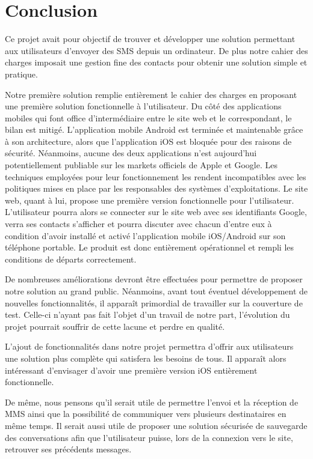  \cleardoublepage

 

\chapter*{Conclusion}


 

Ce projet avait pour objectif de trouver et développer une solution permettant aux utilisateurs d'envoyer des SMS depuis un ordinateur.
De plus notre cahier des charges imposait une gestion fine des contacts pour obtenir une solution simple et pratique.

Notre première solution remplie entièrement le cahier des charges en proposant une première solution fonctionnelle à l'utilisateur. 
Du côté des applications mobiles qui font office d'intermédiaire entre le site web et le correspondant, le bilan est mitigé. L'application mobile Android est terminée et maintenable grâce à son architecture, alors que l'application iOS est bloquée pour des raisons de sécurité.
Néanmoins, aucune des deux applications n'est aujourd'hui potentiellement publiable sur les markets officiels de Apple et Google. Les techniques employées pour leur fonctionnement les rendent incompatibles avec les politiques mises en place par les responsables des systèmes d'exploitations.
Le site web, quant à lui, propose une première version fonctionnelle pour l'utilisateur. L'utilisateur pourra alors se connecter sur le site web avec ses identifiants Google, verra ses contacts s'afficher et pourra discuter avec chacun d'entre eux à condition d'avoir installé et activé l'application mobile iOS/Android sur son téléphone portable.
Le produit est donc entièrement opérationnel et rempli les conditions de départs correctement.

De nombreuses améliorations devront être effectuées pour permettre de proposer notre solution au grand public.
Néanmoins, avant tout éventuel développement de nouvelles fonctionnalités, il apparaît primordial de travailler sur la couverture de test. Celle-ci n'ayant pas fait l'objet d'un travail de notre part, l'évolution du projet pourrait souffrir de cette lacune et perdre en qualité.

L'ajout de fonctionnalités dans notre projet permettra d'offrir aux utilisateurs une solution plus complète qui satisfera les besoins de tous.
Il apparaît alors intéressant d'envisager d'avoir une première version iOS entièrement fonctionnelle.

De même, nous pensons qu'il serait utile de permettre l'envoi et la réception de MMS ainsi que la possibilité de communiquer vers plusieurs destinataires en même temps. Il serait aussi utile de proposer une solution sécurisée de sauvegarde des conversations afin que l'utilisateur puisse, lors de la connexion vers le site, retrouver ses précédents messages.
